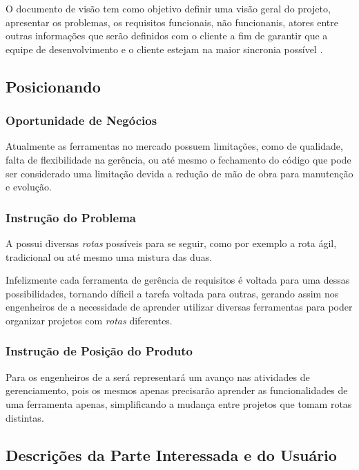 
O documento de visão tem como objetivo definir uma visão geral do projeto, apresentar os problemas, os requisitos funcionais, não funcionanis, atores entre outras informações que serão definidos com o cliente a fim de garantir que a equipe de desenvolvimento e o cliente estejam na maior sincronia possível \cite{IBM:2014:Online}.

\subsection{Posicionando}
\subsubsection{Oportunidade de Negócios}

Atualmente as ferramentas no mercado possuem limitações, como de qualidade, falta de flexibilidade na gerência, ou até mesmo o fechamento do código que pode ser considerado uma limitação devida a redução de mão de obra para manutenção e evolução.

\subsubsection{Instrução do Problema}

A \er{} possui diversas \textit{rotas} possíveis para se seguir, como por exemplo a rota ágil, tradicional ou até mesmo uma mistura das duas.

Infelizmente cada ferramenta de gerência de requisitos é voltada para uma dessas possibilidades, tornando díficil a tarefa voltada para outras, gerando assim nos engenheiros de \er{} a necessidade de aprender utilizar diversas ferramentas para poder organizar projetos com \textit{rotas} diferentes.

\subsubsection{Instrução de Posição do Produto}

Para os engenheiros de \er{} a \nomeferramenta{} será representará um avanço nas atividades de gerenciamento, pois os mesmos apenas precisarão aprender as funcionalidades de uma ferramenta apenas, simplificando a mudança entre projetos que tomam rotas distintas.

\subsection{Descrições da Parte Interessada e do Usuário}

